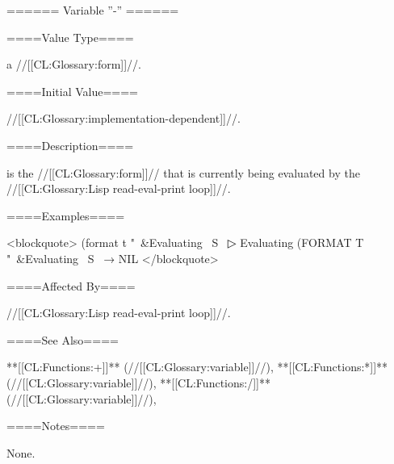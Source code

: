 ====== Variable ''-'' ======

====Value Type====

a //[[CL:Glossary:form]]//.

====Initial Value====

//[[CL:Glossary:implementation-dependent]]//.

====Description====

\Thevalueof{-} is the //[[CL:Glossary:form]]// that is currently being evaluated by the //[[CL:Glossary:Lisp read-eval-print loop]]//.

====Examples====

<blockquote> (format t "~&Evaluating ~S~
▷ Evaluating (FORMAT T "~&Evaluating ~S~ → NIL </blockquote>

====Affected By====

//[[CL:Glossary:Lisp read-eval-print loop]]//.

====See Also====

**[[CL:Functions:+]]** (//[[CL:Glossary:variable]]//), **[[CL:Functions:*]]** (//[[CL:Glossary:variable]]//), **[[CL:Functions:/]]** (//[[CL:Glossary:variable]]//), {\secref\TopLevelLoop}

====Notes====

None.

